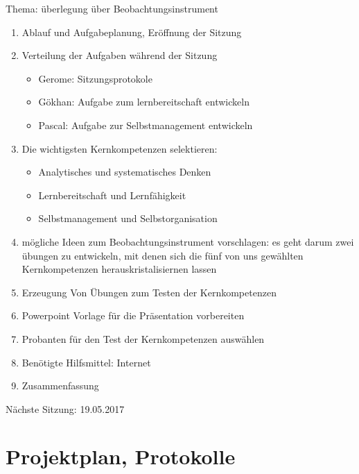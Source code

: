 Thema: überlegung über Beobachtungsinstrument
\begin{enumerate}

\item Ablauf und Aufgabeplanung, Eröffnung der Sitzung 

\item  Verteilung der Aufgaben während der Sitzung
\begin{itemize}
\item Gerome: Sitzungsprotokole
\item Gökhan: Aufgabe zum lernbereitschaft entwickeln
\item Pascal: Aufgabe zur Selbstmanagement entwickeln
\end{itemize}


\item  Die wichtigsten Kernkompetenzen selektieren:
\begin{itemize}
\item Analytisches und systematisches Denken
\item Lernbereitschaft und Lernfähigkeit
\item Selbstmanagement und Selbstorganisation 
\end{itemize}

\item mögliche Ideen zum Beobachtungsinstrument vorschlagen: es geht darum zwei übungen zu entwickeln,  mit denen sich die fünf von uns gewählten Kernkompetenzen herauskristalisiernen lassen

\item Erzeugung Von Übungen zum Testen der Kernkompetenzen

\item Powerpoint Vorlage für die Präsentation vorbereiten	

\item Probanten für den Test der Kernkompetenzen auswählen


\item Benötigte Hilfsmittel: Internet 

\item Zusammenfassung

\end{enumerate}

Nächste Sitzung: 19.05.2017

\newpage
\section*{Projektplan, Protokolle}

